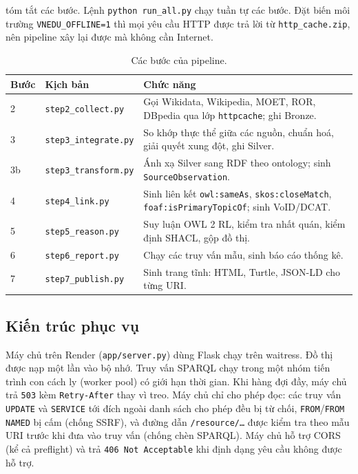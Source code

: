 \documentclass[12pt,a4paper]{article}
\begin{document}
 tóm tắt các bước. Lệnh \texttt{python run\_all.py} chạy tuần tự các bước. Đặt biến môi trường
\texttt{VNEDU\_OFFLINE=1} thì mọi yêu cầu HTTP được trả lời từ \texttt{http\_cache.zip}, nên pipeline xây lại được mà
không cần Internet.

\begin{table}[htbp]
\centering\small
\caption{Các bước của pipeline.}\label{tab:steps}
\begin{tabularx}{\textwidth}{l>{\raggedright\arraybackslash}p{3.6cm}>{\raggedright\arraybackslash}X}
\toprule
Bước & Kịch bản & Chức năng \\
\midrule
2 & \texttt{step2\_collect.py} & Gọi Wikidata, Wikipedia, MOET, ROR, DBpedia qua lớp \texttt{httpcache}; ghi Bronze. \\
3 & \texttt{step3\_integrate.py} & So khớp thực thể giữa các nguồn, chuẩn hoá, giải quyết xung đột, ghi Silver. \\
3b & \texttt{step3\_transform.py} & Ánh xạ Silver sang RDF theo ontology; sinh \texttt{SourceObservation}. \\
4 & \texttt{step4\_link.py} & Sinh liên kết \texttt{owl:sameAs}, \texttt{skos:closeMatch},
\texttt{foaf:isPrimaryTopicOf}; sinh VoID/DCAT. \\
5 & \texttt{step5\_reason.py} & Suy luận OWL 2 RL, kiểm tra nhất quán, kiểm định SHACL, gộp đồ thị. \\
6 & \texttt{step6\_report.py} & Chạy các truy vấn mẫu, sinh báo cáo thống kê. \\
7 & \texttt{step7\_publish.py} & Sinh trang tĩnh: HTML, Turtle, JSON-LD cho từng URI. \\
\bottomrule
\end{tabularx}
\end{table}

\subsection{Kiến trúc phục vụ}
Máy chủ trên Render (\texttt{app/server.py}) dùng Flask chạy trên waitress. Đồ thị được nạp một lần vào bộ nhớ.
Truy vấn SPARQL chạy trong một nhóm tiến trình con cách ly (worker pool) có giới hạn thời gian. Khi hàng đợi đầy, máy
chủ trả \texttt{503} kèm \texttt{Retry-After} thay vì treo. Máy chủ chỉ cho phép đọc: các truy vấn \texttt{UPDATE} và
\texttt{SERVICE} tới đích ngoài danh sách cho phép đều bị từ chối, \texttt{FROM}/\texttt{FROM NAMED} bị cấm (chống SSRF), và đường dẫn \texttt{/resource/…} được
kiểm tra theo mẫu URI trước khi đưa vào truy vấn (chống chèn SPARQL). Máy chủ hỗ trợ CORS (kể cả preflight) và trả
\texttt{406 Not Acceptable} khi định dạng yêu cầu không được hỗ trợ.
\end{document}
